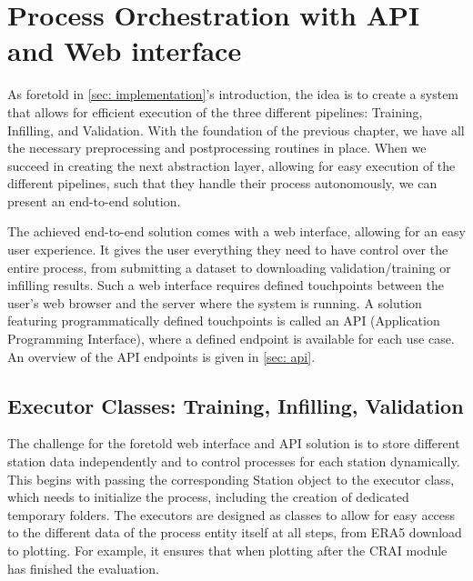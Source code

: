 \section{Process Orchestration with API and Web interface}
\label{sec: process_orchestration}

As foretold in \autoref{sec: implementation}'s introduction, the idea is to create a system that allows for efficient execution of the three different pipelines: Training, Infilling, and Validation.
With the foundation of the previous chapter, we have all the necessary preprocessing and postprocessing routines in place.
When we succeed in creating the next abstraction layer, allowing for easy execution of the different pipelines, such that they handle their process autonomously, we can present an end-to-end solution.

The achieved end-to-end solution comes with a web interface, allowing for an easy user experience.
It gives the user everything they need to have control over the entire process, from submitting a dataset to downloading validation/training or infilling results.
Such a web interface requires defined touchpoints between the user's web browser and the server where the system is running.
A solution featuring programmatically defined touchpoints is called an API (Application Programming Interface), where a defined endpoint is available for each use case.
An overview of the API endpoints is given in \autoref{sec: api}. 

\subsection{Executor Classes: Training, Infilling, Validation}

The challenge for the foretold web interface and API solution is to store different station data independently and to control processes for each station dynamically.
This begins with passing the corresponding Station object to the executor class, which needs to initialize the process, including the creation of dedicated temporary folders.
The executors are designed as classes to allow for easy access to the different data of the process entity itself at all steps, from ERA5 download to plotting. For example, it ensures that when plotting after the CRAI module has finished the evaluation.

